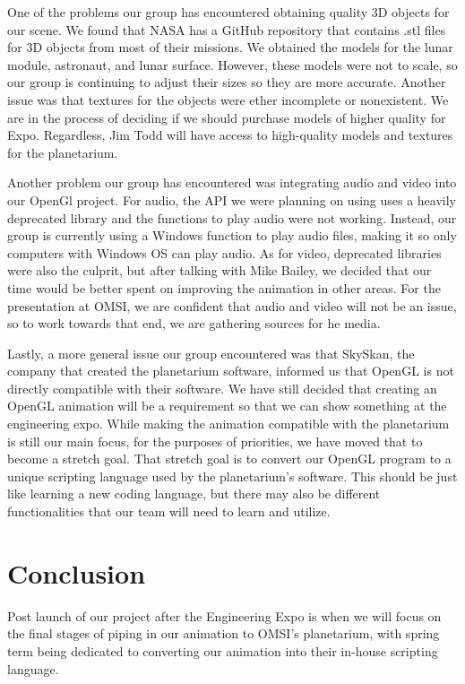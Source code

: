 \documentclass[onecolumn, draftclsnofoot,10pt, compsoc]{IEEEtran}
\begin{document}
One of the problems our group has encountered obtaining quality 3D objects for our scene. We found that NASA has a GitHub repository that contains .stl files for 3D objects from most of their missions. We obtained the models for the lunar module, astronaut, and lunar surface. However, these models were not to scale, so our group is continuing to adjust their sizes so they are more accurate. Another issue was that textures for the objects were ether incomplete or nonexistent. We are in the process of deciding if we should purchase models of higher quality for Expo. Regardless, Jim Todd will have access to high-quality models and textures for the planetarium. 

Another problem our group has encountered was integrating audio and video into our OpenGl project. For audio, the API we were planning on using uses a heavily deprecated library and the functions to play audio were not working. Instead, our group is currently using a Windows function to play audio files, making it so only computers with Windows OS can play audio. As for video, deprecated libraries were also the culprit, but after talking with Mike Bailey, we decided that our time would be better spent on improving the animation in other areas. For the presentation at OMSI, we are confident that audio and video will not be an issue, so to work towards that end, we are gathering sources for he media. 

Lastly, a more general issue our group encountered was that SkySkan, the company that created the planetarium software, informed us that OpenGL is not directly compatible with their software. We have still decided that creating an OpenGL animation will be a requirement so that we can show something at the engineering expo. While making the animation compatible with the planetarium is still our main focus, for the purposes of priorities, we have moved that to become a stretch goal. That stretch goal is to convert our OpenGL program to a unique scripting language used by the planetarium's software. This should be just like learning a new coding language, but there may also be different functionalities that our team will need to learn and utilize. 

\section{Conclusion}

Post launch of our project after the Engineering Expo is when we will focus on the final stages of piping in our animation to OMSI's planetarium, with spring term being dedicated to converting our animation into their in-house scripting language. 
\end{document}
